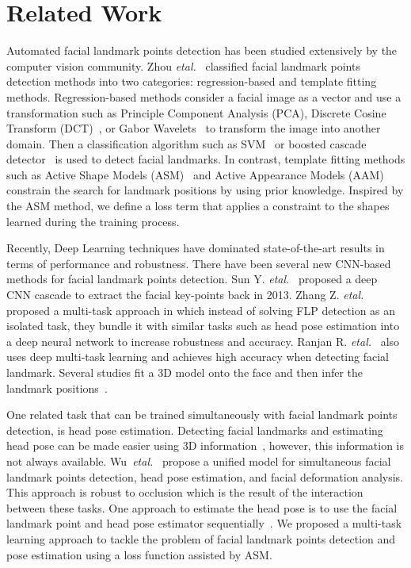 \documentclass[final]{cvpr}
\begin{document}
\section{Related Work}
\label{sec:lit}
Automated facial landmark points detection has been studied extensively by the computer vision community. Zhou \textit{etal.}~\cite{zhou2009automatic} classified facial landmark points detection methods into two categories: regression-based and template fitting methods. Regression-based methods consider a facial image as a vector and use a transformation such as Principle Component Analysis (PCA), Discrete Cosine Transform (DCT)~\cite{salah2007robust}, or Gabor Wavelets~\cite{arca2006face, vukadinovic2005fully} to transform the image into another domain. Then a classification algorithm such as SVM~\cite{antonini2003independent, du2008svm} or boosted cascade detector~\cite{viola2001robust} is used to detect facial landmarks. 
In contrast, template fitting methods such as Active Shape Models (ASM)~\cite{cootes1995active, ordas2003active} and Active Appearance Models (AAM)~\cite{cootes2004statistical} constrain the search for landmark positions by using prior knowledge. Inspired by the ASM method, we define a loss term that applies a constraint to the shapes learned during the training process.

Recently, Deep Learning techniques have dominated state-of-the-art results in terms of performance and robustness. There have been several new CNN-based methods for facial landmark points detection. Sun Y. \textit{etal.}~\cite{sun2013deep} proposed a deep CNN cascade to extract the facial key-points back in 2013. Zhang Z. \textit{etal.}~\cite{zhang2014facial} proposed a multi-task approach in which instead of solving FLP detection as an isolated task, they bundle it with similar tasks such as head pose estimation into a deep neural network to increase robustness and accuracy. Ranjan R. \textit{etal.}~\cite{ranjan2017hyperface} also uses deep multi-task learning and achieves high accuracy when detecting facial landmark. Several studies fit a 3D model onto the face and then infer the landmark positions~\cite{jourabloo2015pose, jourabloo2017pose, zhu2016face}.

One related task that can be trained simultaneously with facial landmark points detection, is head pose estimation. Detecting facial landmarks and estimating head pose can be made easier using 3D information~\cite{tulyakov2015regressing, zhu2016face}, however, this information is not always available. Wu~\textit{etal.}~\cite{wu2017simultaneous} propose a unified model for simultaneous facial landmark points detection, head pose estimation, and facial deformation analysis. This approach is robust to occlusion which is the result of the interaction between these tasks. One approach to estimate the head pose is to use the facial landmark point and head pose estimator sequentially~\cite{vicente2015driver}. We proposed a multi-task learning approach to tackle the problem of facial landmark points detection and pose estimation using a loss function assisted by ASM.
\end{document}
